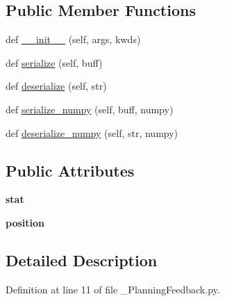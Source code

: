 \subsection*{Public Member Functions}
\begin{DoxyCompactItemize}
\item 
def \hyperlink{classexp__assignment2_1_1msg_1_1__PlanningFeedback_1_1PlanningFeedback_a412b2dd1816a388daf353cf71191b283}{\+\_\+\+\_\+init\+\_\+\+\_\+} (self, args, kwds)
\item 
def \hyperlink{classexp__assignment2_1_1msg_1_1__PlanningFeedback_1_1PlanningFeedback_acfd4e59e0eecf15fa6aac79255ef976d}{serialize} (self, buff)
\item 
def \hyperlink{classexp__assignment2_1_1msg_1_1__PlanningFeedback_1_1PlanningFeedback_ad8e457e0a3102fe79cddca08c457c62f}{deserialize} (self, str)
\item 
def \hyperlink{classexp__assignment2_1_1msg_1_1__PlanningFeedback_1_1PlanningFeedback_a94d462dcbf5f7aa9c9abf3d28aa92e32}{serialize\+\_\+numpy} (self, buff, numpy)
\item 
def \hyperlink{classexp__assignment2_1_1msg_1_1__PlanningFeedback_1_1PlanningFeedback_a6c10d6b4c5a6f13bda1007a4af6a293a}{deserialize\+\_\+numpy} (self, str, numpy)
\end{DoxyCompactItemize}
\subsection*{Public Attributes}
\begin{DoxyCompactItemize}
\item 
\mbox{\label{classexp__assignment2_1_1msg_1_1__PlanningFeedback_1_1PlanningFeedback_afe7269b2950fbb7f758b314a2310f2c2}} 
{\bfseries stat}
\item 
\mbox{\label{classexp__assignment2_1_1msg_1_1__PlanningFeedback_1_1PlanningFeedback_a9e0815b78d936199983e79b7aa00127a}} 
{\bfseries position}
\end{DoxyCompactItemize}


\subsection{Detailed Description}


Definition at line 11 of file \+\_\+\+Planning\+Feedback.\+py.



